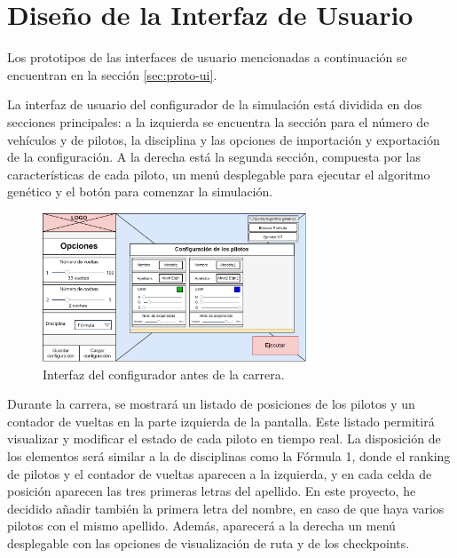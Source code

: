 \section{Diseño de la Interfaz de Usuario}

Los prototipos de las interfaces de usuario mencionadas a continuación se encuentran en la sección \ref{sec:proto-ui}.

\bigskip

La interfaz de usuario del configurador de la simulación
está dividida en dos secciones principales: a la izquierda se encuentra la sección para el número de vehículos y de pilotos, la disciplina y las opciones de importación y exportación de la configuración. A la derecha está la segunda sección, compuesta por las características de cada piloto, un menú desplegable para ejecutar el algoritmo genético y el botón para comenzar la simulación.

\begin{figure}[H]
    \centering
    \includegraphics[width=0.7\textwidth]{imagenes/pag1.png}
    \caption{Interfaz del configurador antes de la carrera.}
\end{figure}

Durante la carrera, se mostrará un listado de posiciones de los pilotos y un contador de vueltas 
en la parte izquierda de la pantalla. Este listado permitirá visualizar y modificar el estado de cada piloto en tiempo real. La disposición de los elementos será similar a la de disciplinas como la Fórmula 1, donde el ranking de pilotos y el contador de vueltas aparecen a la izquierda, y en cada celda de posición aparecen las tres primeras letras del apellido. En este proyecto, he decidido añadir también la primera letra del nombre, en caso de que haya varios pilotos con el mismo apellido. Además, aparecerá a la derecha un menú desplegable con las opciones de visualización de ruta y de los checkpoints.


